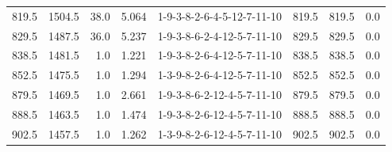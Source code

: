 \begin{tabular}{rrrrlrrr}
 819.5 &  1504.5 &           38.0 &              5.064 &  1-9-3-8-2-6-4-5-12-7-11-10 &         819.5 &           819.5 &       0.0 \\
 829.5 &  1487.5 &           36.0 &              5.237 &  1-9-3-8-6-2-4-12-5-7-11-10 &         829.5 &           829.5 &       0.0 \\
 838.5 &  1481.5 &            1.0 &              1.221 &  1-9-3-8-2-6-4-12-5-7-11-10 &         838.5 &           838.5 &       0.0 \\
 852.5 &  1475.5 &            1.0 &              1.294 &  1-3-9-8-2-6-4-12-5-7-11-10 &         852.5 &           852.5 &       0.0 \\
 879.5 &  1469.5 &            1.0 &              2.661 &  1-9-3-8-6-2-12-4-5-7-11-10 &         879.5 &           879.5 &       0.0 \\
 888.5 &  1463.5 &            1.0 &              1.474 &  1-9-3-8-2-6-12-4-5-7-11-10 &         888.5 &           888.5 &       0.0 \\
 902.5 &  1457.5 &            1.0 &              1.262 &  1-3-9-8-2-6-12-4-5-7-11-10 &         902.5 &           902.5 &       0.0 \\
\bottomrule
\end{tabular}
